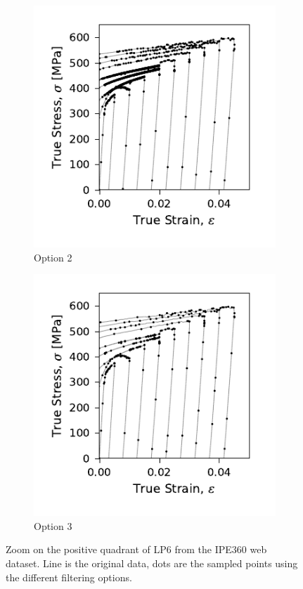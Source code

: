\documentclass[a4paper,11pt]{article}
\begin{document}
\begin{figure}
    \begin{subfigure}[b]{0.49\linewidth}
        \centering
        \includegraphics{LP6_dots_WP3_IPE360_C_CRM8_op2_.pdf}
        \caption{Option 2}
    \end{subfigure}
    \begin{subfigure}[b]{0.49\linewidth}
        \centering
        \includegraphics{LP6_dots_WP3_IPE360_C_CRM8_op3_.pdf}
        \caption{Option 3}
    \end{subfigure}
    \caption{Zoom on the positive quadrant of LP6 from the IPE360 web dataset. Line is the original data, dots are the sampled points using the different filtering options.}
    \label{fig:filtering-compare-dots}
\end{figure}
\end{document}
